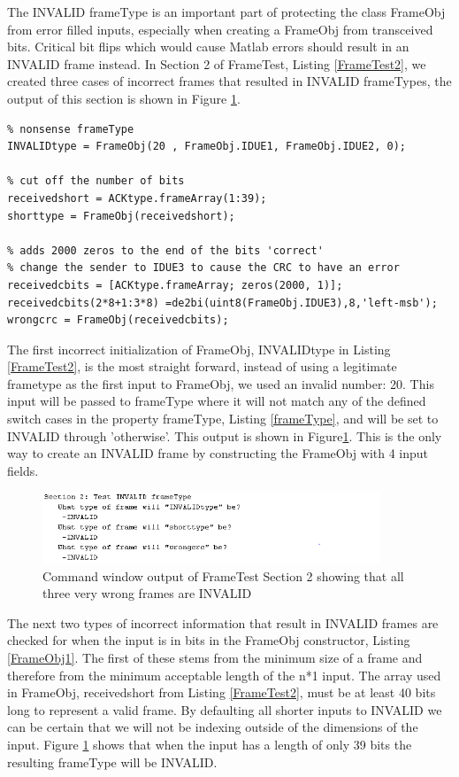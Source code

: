 The INVALID frameType is an important part of protecting the class FrameObj from error filled inputs, especially when creating a FrameObj from transceived bits. Critical bit flips which would cause Matlab errors should result in an INVALID frame instead. In Section 2 of FrameTest, Listing \ref{FrameTest2}, we created three cases of incorrect frames that resulted in INVALID frameTypes, the output of this section is shown in Figure \ref{fig:FrameTest2}.

\begin{lstlisting} 
% nonsense frameType
INVALIDtype = FrameObj(20 , FrameObj.IDUE1, FrameObj.IDUE2, 0);

% cut off the number of bits
receivedshort = ACKtype.frameArray(1:39);
shorttype = FrameObj(receivedshort);

% adds 2000 zeros to the end of the bits 'correct'
% change the sender to IDUE3 to cause the CRC to have an error
receivedcbits = [ACKtype.frameArray; zeros(2000, 1)];
receivedcbits(2*8+1:3*8) =de2bi(uint8(FrameObj.IDUE3),8,'left-msb');
wrongcrc = FrameObj(receivedcbits);
\end{lstlisting} 

The first incorrect initialization of FrameObj, INVALIDtype in Listing \ref{FrameTest2}, is the most straight forward, instead of using a legitimate frametype as the first input to FrameObj, we used an invalid number: 20. This input will be passed to frameType where it will not match any of the defined switch cases in the property frameType, Listing \ref{frameType}, and will be set to INVALID through 'otherwise'. This output is shown in Figure\ref{fig:FrameTest2}.  This is the only way to create an INVALID frame by constructing the FrameObj with 4 input fields. 

\begin{figure}[h]
    \includegraphics[width=0.9\textwidth, left]{FrameTest2.PNG}
    \caption{Command window output of FrameTest Section 2 showing that all three very wrong frames are INVALID }
    \label{fig:FrameTest2}
\end{figure}

The next two types of incorrect information that result in INVALID frames are checked for when the input is in bits in the FrameObj constructor, Listing \ref{FrameObj1}. The first of these stems from the minimum size of a frame and therefore from the minimum acceptable length of the n*1 input. The array used in FrameObj, receivedshort from Listing \ref{FrameTest2},  must be at least 40 bits long to represent a valid frame. By defaulting all shorter inputs to INVALID we can be certain that we will not be indexing outside of the dimensions of the input. Figure \ref{fig:FrameTest2} shows that when the input has a length of only 39 bits the resulting frameType will be INVALID. 

